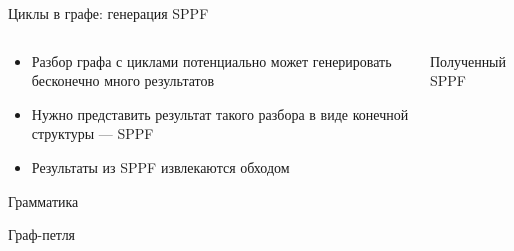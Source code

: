 \documentclass[aspectratio=169]{beamer}
\begin{document}

\begin{frame}{Циклы в графе: генерация SPPF}
  \begin{columns}[c]
    \begin{column}{0.55\textwidth}
      \begin{itemize}
        \item Разбор графа с циклами потенциально может генерировать бесконечно много результатов
        \item Нужно представить результат такого разбора в виде конечной структуры --- SPPF
        \item Результаты из SPPF извлекаются обходом
      \end{itemize}

      \vspace{1cm}

      \begin{minipage}[t]{0.49\textwidth}

        \centering Грамматика
      \end{minipage}
      \begin{minipage}[t]{0.49\textwidth}
        \center{}

        \centering Граф-петля
      \end{minipage}%

    \end{column}
    \begin{column}{0.55\textwidth}
      \center{}

      \centering Полученный SPPF
    \end{column}
  \end{columns}
\end{frame}


\end{document}

